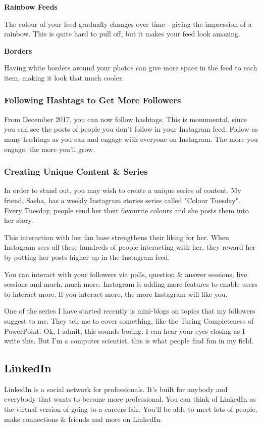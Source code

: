 \documentclass{article}
\begin{document}
\textbf{Rainbow Feeds}

The colour of your feed gradually changes over time - giving the
impression of a rainbow. This is quite hard to pull off, but it makes
your feed look amazing.

\textbf{Borders}

Having white borders around your photos can give more space in the feed
to each item, making it look that much cooler.

\subsubsection{Following Hashtags to Get More Followers}
From December 2017, you can now follow hashtags. This is monumental,
since you can see the posts of people you don't follow in your Instagram
feed. Follow as many hashtags as you can and engage with everyone on
Instagram. The more you engage, the more you'll grow.
\subsubsection{Creating Unique Content \& Series}
In order to stand out, you may wish to create a unique series of
content. My friend, Sasha, has a weekly Instagram stories series called
"Colour Tuesday". Every Tuesday, people send her their favourite
colours and she posts them into her story.

This interaction with her fan base strengthens their liking for her.
When Instagram sees all these hundreds of people interacting with her,
they reward her by putting her posts higher up in the Instagram feed.

You can interact with your followers via polls, question \& answer
sessions, live sessions and much, much more. Instagram is adding more
features to enable users to interact more. If you interact more, the
more Instagram will like you.

One of the series I have started recently is mini-blogs on topics that
my followers suggest to me. They tell me to cover something, like the
Turing Completeness of PowerPoint. Ok, I admit, this sounds boring. I
can hear your eyes closing as I write this. But I'm a computer
scientist, this is what people find fun in my field.
\subsection{LinkedIn}
LinkedIn is a social network for professionals. It's built for anybody
and everybody that wants to become more professional. You can think of
LinkedIn as the virtual version of going to a careers fair. You'll be
able to meet lots of people, make connections \& friends and more on
LinkedIn.
\end{document}
